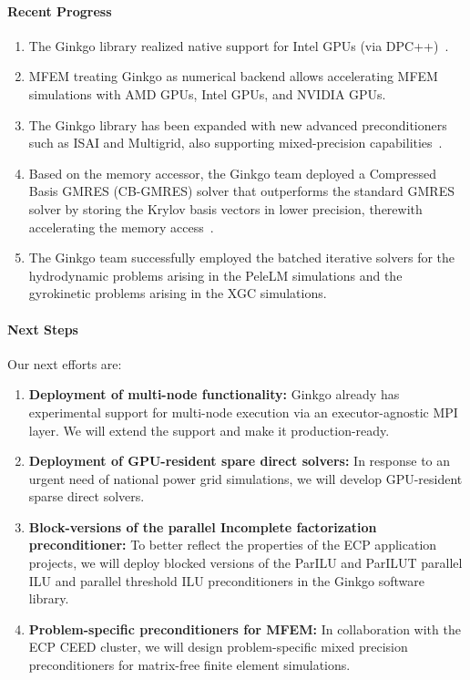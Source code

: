 \paragraph{Recent Progress}
\begin{enumerate}
  \item The Ginkgo library realized native support for Intel GPUs (via
		DPC++)~\cite{tsai2021porting}.
  \item MFEM treating Ginkgo as numerical backend allows accelerating MFEM
		simulations with AMD GPUs, Intel GPUs, and NVIDIA GPUs.
  \item The Ginkgo library has been expanded with new advanced preconditioners
		such as ISAI and Multigrid, also supporting mixed-precision capabilities~\cite{10.1007/978-3-030-85665-6_34}.
  \item Based on the memory accessor, the Ginkgo team deployed a Compressed
		Basis GMRES (CB-GMRES) solver that outperforms the standard GMRES solver
		by storing the Krylov basis vectors in lower precision, therewith
		accelerating the memory access~\cite{DBLP:journals/corr/abs-2009-12101}.
  \item The Ginkgo team successfully employed the batched iterative solvers for
		the hydrodynamic problems arising in the PeleLM
		simulations and the gyrokinetic problems arising in the
		XGC simulations.
\end{enumerate}


\paragraph{Next Steps}
Our next efforts are:
\begin{enumerate}
  \item \textbf{Deployment of multi-node functionality:} Ginkgo already has
		experimental support for multi-node execution via an executor-agnostic
		MPI layer. We will extend the support and make it production-ready.
  \item \textbf{Deployment of GPU-resident spare direct solvers:} In response to
		an urgent need of national power grid simulations, we will develop
		GPU-resident sparse direct solvers.
  \item \textbf{Block-versions of the parallel Incomplete factorization
		preconditioner:} To better reflect the properties of the ECP application
		projects, we will deploy blocked versions of the ParILU and ParILUT
		parallel ILU and parallel threshold ILU preconditioners in the Ginkgo
		software library.
  \item \textbf{Problem-specific preconditioners for MFEM:} In collaboration
		with the ECP CEED cluster, we will design problem-specific mixed
		precision preconditioners for matrix-free finite element simulations.
\end{enumerate}
